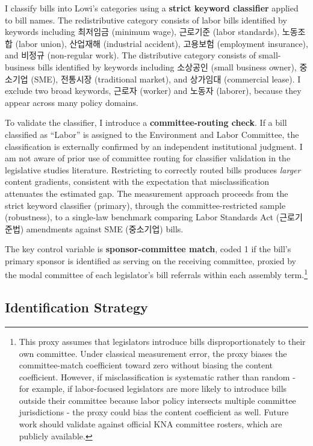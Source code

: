 \documentclass[11pt]{article}
\begin{document}
I classify bills into Lowi's categories using a \textbf{strict keyword classifier} applied to bill names. The redistributive category consists of labor bills identified by keywords including 최저임금 (minimum wage), 근로기준 (labor standards), 노동조합 (labor union), 산업재해 (industrial accident), 고용보험 (employment insurance), and 비정규 (non-regular work). The distributive category consists of small-business bills identified by keywords including 소상공인 (small business owner), 중소기업 (SME), 전통시장 (traditional market), and 상가임대 (commercial lease). I exclude two broad keywords, 근로자 (worker) and 노동자 (laborer), because they appear across many policy domains.

To validate the classifier, I introduce a \textbf{committee-routing check}. If a bill classified as ``Labor'' is assigned to the Environment and Labor Committee, the classification is externally confirmed by an independent institutional judgment. I am not aware of prior use of committee routing for classifier validation in the legislative studies literature. Restricting to correctly routed bills produces \emph{larger} content gradients, consistent with the expectation that misclassification attenuates the estimated gap. The measurement approach proceeds from the strict keyword classifier (primary), through the committee-restricted sample (robustness), to a single-law benchmark comparing Labor Standards Act (근로기준법) amendments against SME (중소기업) bills.

The key control variable is \textbf{sponsor-committee match}, coded 1 if the bill's primary sponsor is identified as serving on the receiving committee, proxied by the modal committee of each legislator's bill referrals within each assembly term.\footnote{This proxy assumes that legislators introduce bills disproportionately to their own committee. Under classical measurement error, the proxy biases the committee-match coefficient toward zero without biasing the content coefficient. However, if misclassification is systematic rather than random - for example, if labor-focused legislators are more likely to introduce bills outside their committee because labor policy intersects multiple committee jurisdictions - the proxy could bias the content coefficient as well. Future work should validate against official KNA committee rosters, which are publicly available.}

\subsection{Identification Strategy}
\label{sec:ident}
\end{document}
